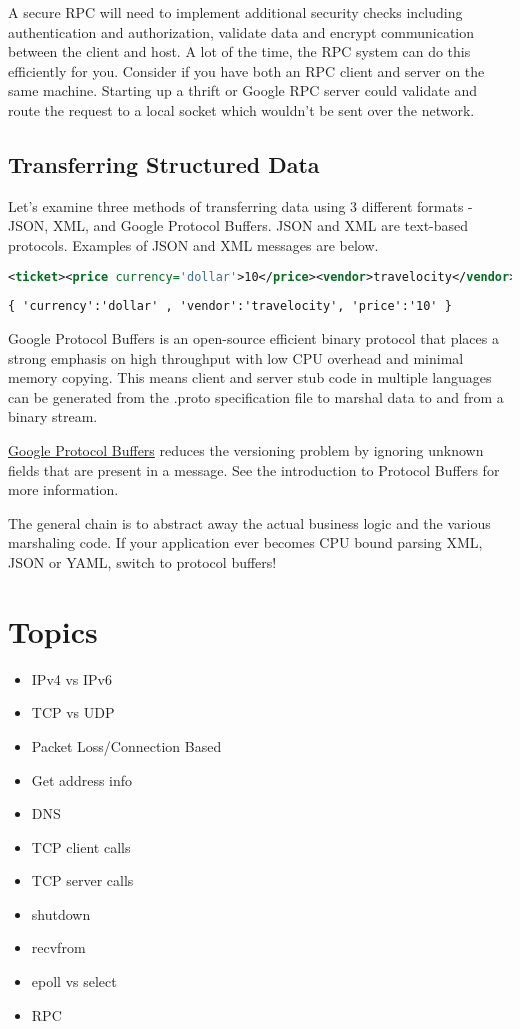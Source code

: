 A secure RPC will need to implement additional security checks including authentication and authorization, validate data and encrypt communication between the client and host.
A lot of the time, the RPC system can do this efficiently for you. Consider if you have both an RPC client and server on the same machine.
Starting up a thrift or Google RPC server could validate and route the request to a local socket which wouldn't be sent over the network.

\subsection{Transferring Structured Data}

Let's examine three methods of transferring data using 3 different formats - JSON, XML, and Google Protocol Buffers.
JSON and XML are text-based protocols.
Examples of JSON and XML messages are below.

\begin{lstlisting}[language=XML]
<ticket><price currency='dollar'>10</price><vendor>travelocity</vendor></ticket>
\end{lstlisting}

\begin{lstlisting}
{ 'currency':'dollar' , 'vendor':'travelocity', 'price':'10' }
\end{lstlisting}

Google Protocol Buffers is an open-source efficient binary protocol that places a strong emphasis on high throughput with low CPU overhead and minimal memory copying.
This means client and server stub code in multiple languages can be generated from the .proto specification file to marshal data to and from a binary stream.

\href{https://developers.google.com/protocol-buffers/docs/overview}{Google Protocol Buffers} reduces the versioning problem by ignoring unknown fields that are present in a message.
See the introduction to Protocol Buffers for more information.

The general chain is to abstract away the actual business logic and the various marshaling code.
If your application ever becomes CPU bound parsing XML, JSON or YAML, switch to protocol buffers!

\section{Topics}

\begin{itemize}
\item
  IPv4 vs IPv6
\item
  TCP vs UDP
\item
  Packet Loss/Connection Based
\item
  Get address info
\item
  DNS
\item
  TCP client calls
\item
  TCP server calls
\item
  shutdown
\item
  recvfrom
\item
  epoll vs select
\item
  RPC
\end{itemize}

